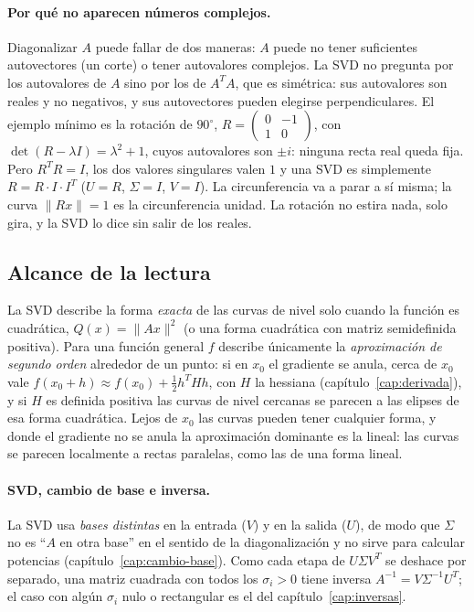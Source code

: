 \paragraph{Por qué no aparecen números complejos.} Diagonalizar \(A\) puede fallar de dos
maneras: \(A\) puede no tener suficientes autovectores (un corte) o tener autovalores
complejos. La SVD no pregunta por los autovalores de \(A\) sino por los de \(A^TA\), que es
simétrica: sus autovalores son reales y no negativos, y sus autovectores pueden elegirse
perpendiculares. El ejemplo mínimo es la rotación de \(90^\circ\),
\(R=\left(\begin{smallmatrix}0&-1\\1&0\end{smallmatrix}\right)\), con
\(\det(R-\lambda I)=\lambda^2+1\), cuyos autovalores son \(\pm i\): ninguna recta real queda fija. Pero \(R^TR=I\), los dos
valores singulares valen \(1\) y una SVD es simplemente \(R=R\cdot I\cdot I^T\) (\(U=R\),
\(\Sigma=I\), \(V=I\)). La circunferencia va a parar a sí misma; la curva \(\|Rx\|=1\) es la
circunferencia unidad. La rotación no estira nada, solo gira, y la SVD lo dice sin salir de
los reales.

\subsection{Alcance de la lectura}

\begin{atencion}
La SVD describe la forma \emph{exacta} de las curvas de nivel solo cuando la función es
cuadrática, \(Q(x)=\|Ax\|^2\) (o una forma cuadrática con matriz semidefinida positiva).
Para una función general \(f\) describe únicamente la \emph{aproximación de segundo orden}
alrededor de un punto: si en \(x_0\) el gradiente se anula, cerca de \(x_0\) vale
\(f(x_0+h)\approx f(x_0)+\tfrac12h^THh\), con \(H\) la hessiana
(capítulo~\ref{cap:derivada}), y si \(H\) es definida positiva las curvas de nivel cercanas
se parecen a las elipses de esa forma cuadrática. Lejos de \(x_0\) las curvas pueden tener
cualquier forma, y donde el gradiente no se anula la aproximación dominante es la lineal:
las curvas se parecen localmente a rectas paralelas, como las de una forma lineal.
\end{atencion}

\paragraph{SVD, cambio de base e inversa.} La SVD usa \emph{bases distintas} en la entrada
(\(V\)) y en la salida (\(U\)), de modo que \(\Sigma\) no es \enquote{\(A\) en otra base} en
el sentido de la diagonalización y no sirve para calcular potencias
(capítulo~\ref{cap:cambio-base}). Como cada etapa de \(U\Sigma V^T\) se deshace por separado,
una matriz cuadrada con todos los \(\sigma_i>0\) tiene inversa \(A^{-1}=V\Sigma^{-1}U^T\); el
caso con algún \(\sigma_i\) nulo o rectangular es el del capítulo~\ref{cap:inversas}.

